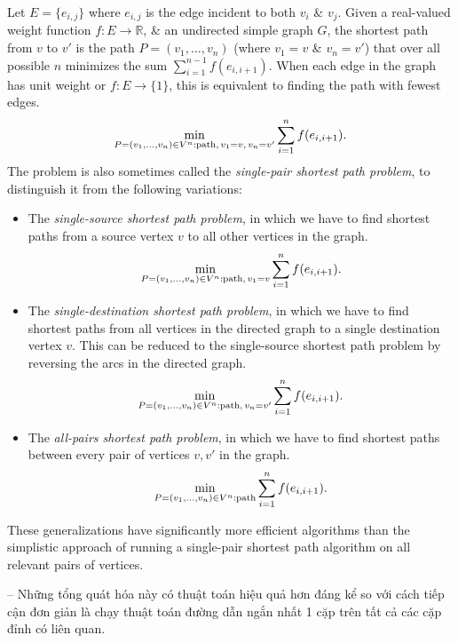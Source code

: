 \documentclass[oneside]{book}
\begin{document}
Let $E = \{e_{i,j}\}$ where $e_{i,j}$ is the edge incident to both $v_i$ \& $v_j$. Given a real-valued weight function $f:E\to\mathbb{R}$, \& an undirected simple graph $G$, the shortest path from $v$ to $v'$ is the path $P = (v_1,\ldots,v_n)$ (where $v_1 = v$ \& $v_n = v'$) that over all possible $n$ minimizes the sum $\sum_{i=1}^{n-1} f(e_{i,i+1})$. When each edge in the graph has unit weight or $f:E\to\{1\}$, this is equivalent to finding the path with fewest edges.
\begin{equation*}
	\min_{P = (v_1,\ldots,v_n)\in V^n:{\rm path},\,v_1 = v,\,v_n = v'} \sum_{i=1}^n f(e_{i,i+1}).
\end{equation*}
The problem is also sometimes called the {\it single-pair shortest path problem}, to distinguish it from the following variations:
\begin{itemize}
	\item The {\it single-source shortest path problem}, in which we have to find shortest paths from a source vertex $v$ to all other vertices in the graph.
	\begin{equation*}
		\min_{P = (v_1,\ldots,v_n)\in V^n:{\rm path},\,v_1 = v} \sum_{i=1}^n f(e_{i,i+1}).
	\end{equation*}
	\item The {\it single-destination shortest path problem}, in which we have to find shortest paths from all vertices in the directed graph to a single destination vertex $v$. This can be reduced to the single-source shortest path problem by reversing the arcs in the directed graph.
	\begin{equation*}
		\min_{P = (v_1,\ldots,v_n)\in V^n:{\rm path},\,v_n = v'} \sum_{i=1}^n f(e_{i,i+1}).
	\end{equation*}
	\item The {\it all-pairs shortest path problem}, in which we have to find shortest paths between every pair of vertices $v,v'$ in the graph.
	\begin{equation*}
		\min_{P = (v_1,\ldots,v_n)\in V^n:{\rm path}} \sum_{i=1}^n f(e_{i,i+1}).
	\end{equation*}
\end{itemize}
These generalizations have significantly more efficient algorithms than the simplistic approach of running a single-pair shortest path algorithm on all relevant pairs of vertices.

-- Những tổng quát hóa này có thuật toán hiệu quả hơn đáng kể so với cách tiếp cận đơn giản là chạy thuật toán đường dẫn ngắn nhất 1 cặp trên tất cả các cặp đỉnh có liên quan.
\end{document}
